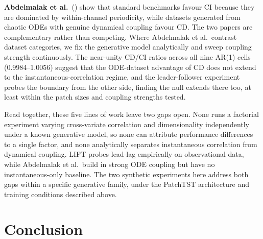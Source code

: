 \documentclass[10pt]{article} %
\begin{document}
    \textbf{Abdelmalak et al.}~(\citeyear{abdelmalak2025channeldependence}) show that standard benchmarks favour CI because
    they are dominated by within-channel periodicity, while datasets generated from chaotic ODEs with genuine
    dynamical coupling favour CD. The two papers are complementary rather than competing. Where Abdelmalak et al.\
    contrast dataset categories, we fix the generative model analytically and sweep coupling strength continuously.
    The near-unity CD/CI ratios across all nine AR(1) cells (0.9984--1.0056) suggest that the ODE-dataset advantage
    of CD does not extend to the instantaneous-correlation regime, and the leader-follower experiment probes the
    boundary from the other side, finding the null extends there too, at least within the patch sizes and
    coupling strengths tested.

    Read together, these five lines of work leave two gaps open. None runs a factorial experiment varying cross-variate
    correlation and dimensionality independently under a known generative model, so none can attribute performance
    differences to a single factor, and none analytically separates instantaneous correlation from dynamical coupling.
    LIFT probes lead-lag empirically on observational data, while Abdelmalak et al.\ build in strong ODE coupling but have no
    instantaneous-only baseline. The two synthetic experiments here address both gaps within a specific generative
    family, under the PatchTST architecture and training conditions described above.


    \section{Conclusion}
    \label{sec:conclusion}
\end{document}
